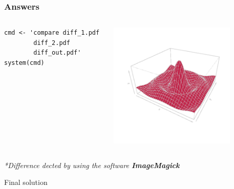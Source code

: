 \documentclass{beamer}
\begin{document}
\begin{frame}[fragile]
\frametitle{Answers}

\begin{columns}

\begin{lstlisting}
cmd <- 'compare diff_1.pdf 
        diff_2.pdf 
        diff_out.pdf'
system(cmd)
\end{lstlisting}

\begin{center}
\includegraphics[height = 6cm, width = 6cm]{plot/diff_out.pdf}
\end{center}

\end{columns}

\hfill \textit{*Difference dected by using the software \textbf{ImageMagick}}

\end{frame}




\begin{frame}
\begin{center}
\Huge Final solution
\end{center}
\end{frame}
\end{document}
